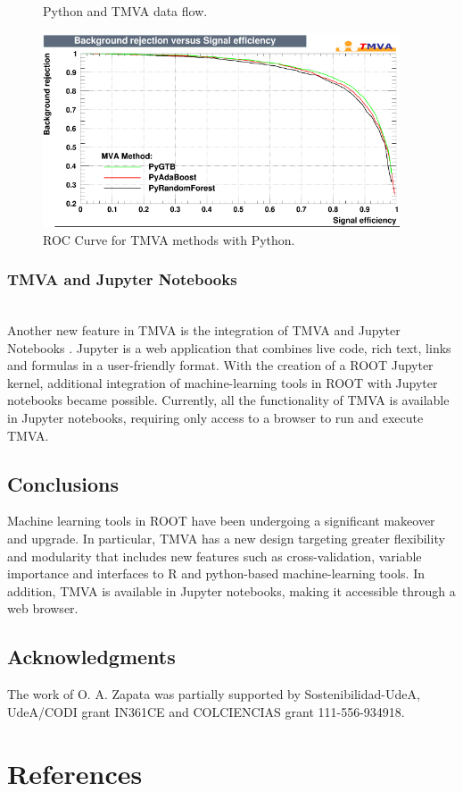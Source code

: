 \documentclass[a4paper]{jpconf}
\begin{document}
\begin{figure}[h]
\begin{minipage}{15pc}
\vspace{6pc}%
\caption{\label{pymvadf}Python and TMVA data flow.}
\end{minipage}\hspace{2pc}%
\vspace{2pc}
\includegraphics[width=25pc]{img/pymvaroc.png}\caption{\label{pymvaroc} ROC Curve for TMVA methods with Python.}
\end{figure}


\subsubsection{TMVA and Jupyter Notebooks}\hspace*{\fill} \\
Another new feature in TMVA is the integration of TMVA and Jupyter Notebooks \cite{PER-GRA:2007}. Jupyter is a web application that combines live code, rich text, links and formulas in a user-friendly format. With the creation of a ROOT Jupyter kernel, additional integration of machine-learning tools in ROOT with Jupyter notebooks became possible. Currently, all the functionality of TMVA is available in Jupyter notebooks, requiring only access to a browser to run and execute TMVA.



\subsection{Conclusions}
Machine learning tools in ROOT have been undergoing a significant makeover and upgrade. In particular, TMVA has a new design targeting greater flexibility and modularity that includes new features such as cross-validation, variable importance and interfaces to R and python-based machine-learning tools. In addition, TMVA is available in Jupyter notebooks, making it accessible through a web browser.



\subsection{Acknowledgments}
The work of O. A. Zapata was partially supported by Sostenibilidad-UdeA, UdeA/CODI grant IN361CE and COLCIENCIAS grant 111-556-934918.\newline


\section*{References}


\end{document}
